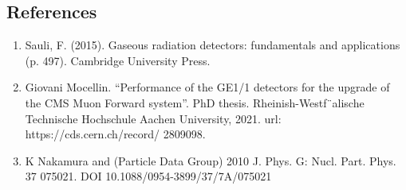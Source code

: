 \documentclass{article}
\begin{document}
\subsection*{References}
\begin{enumerate}
    \item Sauli, F. (2015). Gaseous radiation detectors: fundamentals and applications (p. 497). Cambridge University Press.
    \item Giovani Mocellin. “Performance of the GE1/1 detectors for the upgrade of the
    CMS Muon Forward system”. PhD thesis. Rheinish-Westf¨alische Technische
    Hochschule Aachen University, 2021. url: https://cds.cern.ch/record/
    2809098.
    \item K Nakamura and (Particle Data Group) 2010 J. Phys. G: Nucl. Part. Phys. 37 075021. DOI 10.1088/0954-3899/37/7A/075021
\end{enumerate}





\end{document}
